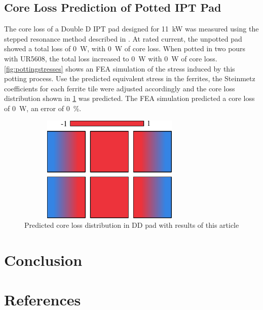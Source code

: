 \documentclass[conference]{IEEEtran}
\begin{document}
\subsection{Core Loss Prediction of Potted IPT Pad}
The core loss of a Double D IPT pad designed for \SI{11}{\kilo\watt} was measured using the stepped resonance method described in \cite{kalraPowerLossMeasurement2020}.
At rated current, the unpotted pad showed a total loss of \SI{0}{\watt}, with \SI{0}{\watt} of core loss.
When potted in two pours with UR5608, the total loss increased to \SI{0}{\watt} with \SI{0}{\watt} of core loss. 
\cref{fig:pottingstresses} shows an FEA simulation of the stress induced by this potting process. 
Use the predicted equivalent stress in the ferrites, the Steinmetz coefficients for each ferrite tile were adjusted accordingly and the core loss distribution shown in \cref{fig:padcoreloss} was predicted. 
The FEA simulation predicted a core loss of \SI{0}{\watt}, an error of \SI{0}{\percent}. 
\begin{figure}[t]
  \includegraphics[width=3.5in, height=2in]{figures/simulatedpottingpadstresses.pdf}
  \caption{Predicted core loss distribution in DD pad with results of this article}
  \label{fig:padcoreloss}
\end{figure}

\section{Conclusion}

\section*{References}
\printbibliography[heading=none]
\end{document}
